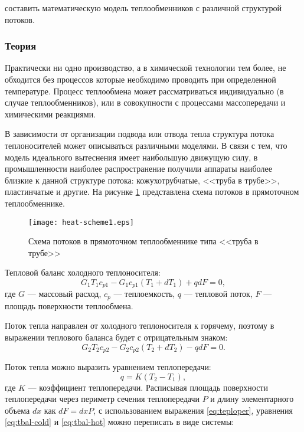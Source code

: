 
\goal составить математическую модель теплообменников с различной структурой потоков.

\subsubsection{Теория}
Практически ни одно производство, а в химической технологии тем более, не обходится без процессов которые необходимо проводить при определенной температуре. Процесс теплообмена может рассматриваться индивидуально (в случае теплообменников), или в совокупности с процессами массопередачи и химическими реакциями.

В зависимости от организации подвода или отвода тепла структура потока теплоносителей может описываться различными моделями. В связи с тем, что модель идеального вытеснения имеет наибольшую движущую силу, в промышленности наиболее распространение получили аппараты наиболее близкие к данной структуре потока: кожухотрубчатые, <<труба в трубе>>, пластинчатые и другие. На рисунке  \ref{fig:heat.scheme1} представлена схема потоков в прямоточном теплообменнике.

\begin{figure}[h]
	\begin{center}
		\texttt{[image: heat-scheme1.eps]}
	\end{center}
	\caption{Схема потоков в прямоточном теплообменнике типа <<труба в трубе>>} \label{fig:heat.scheme1}
\end{figure}

Тепловой баланс холодного теплоносителя:
\begin{equation}\label{eq:tbal-cold}
	G_1 T_1 c_{p1}-G_1 c_{p1} (T_1+ d T_1) + q d F=0,
\end{equation}
где $G$ --- массовый расход, $c_p$ --- теплоемкость, $q$ --- тепловой поток, $F$ --- площадь поверхности теплообмена.

Поток тепла направлен от холодного теплоносителя к горячему, поэтому в выражении теплового баланса будет с отрицательным знаком:
\begin{equation}\label{eq:tbal-hot}
	G_2 T_2 c_{p2} -G_2 c_{p2} (T_2 + d T_2) - q d F =0.
\end{equation}

Поток тепла можно выразить уравнением теплопередачи:
\begin{equation}\label{eq:teploper}
	q=K(T_2-T_1),
\end{equation}
где $K$ --- коэффициент теплопередачи. Расписывая площадь поверхности теплопередачи через периметр сечения теплопередачи $P$ и длину элементарного объема $d x$ как $d F = d x P$, с использованием выражения \eqref{eq:teploper}, уравнения \eqref{eq:tbal-cold} и \eqref{eq:tbal-hot} можно переписать в виде системы:

